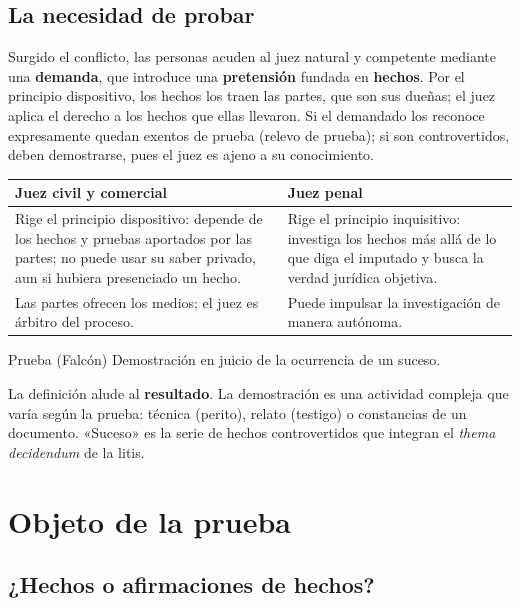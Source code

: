 \documentclass[12pt,oneside]{book}
\renewcommand{\arraystretch}{1.15}
\begin{document}
\subsection{La necesidad de probar}

Surgido el conflicto, las personas acuden al juez natural y competente mediante una \textbf{demanda}, que introduce una \textbf{pretensión} fundada en \textbf{hechos}. Por el principio dispositivo, los hechos los traen las partes, que son sus dueñas; el juez aplica el derecho a los hechos que ellas llevaron. Si el demandado los reconoce expresamente quedan exentos de prueba (relevo de prueba); si son controvertidos, deben demostrarse, pues el juez es ajeno a su conocimiento.

\begin{table}[H]
\centering
\renewcommand{\arraystretch}{1.25}
\begin{tabularx}{\textwidth}{>{\RaggedRight\arraybackslash}X>{\RaggedRight\arraybackslash}X}
\toprule
\textbf{Juez civil y comercial} & \textbf{Juez penal} \\
\midrule
Rige el principio dispositivo: depende de los hechos y pruebas aportados por las partes; no puede usar su saber privado, aun si hubiera presenciado un hecho. & Rige el principio inquisitivo: investiga los hechos más allá de lo que diga el imputado y busca la verdad jurídica objetiva. \\
Las partes ofrecen los medios; el juez es árbitro del proceso. & Puede impulsar la investigación de manera autónoma. \\
\bottomrule
\end{tabularx}
\end{table}

\begin{definition}{Prueba (Falcón)}
Demostración en juicio de la ocurrencia de un suceso.
\end{definition}

La definición alude al \textbf{resultado}. La demostración es una actividad compleja que varía según la prueba: técnica (perito), relato (testigo) o constancias de un documento. «Suceso» es la serie de hechos controvertidos que integran el \textit{thema decidendum} de la litis.

\section{Objeto de la prueba}

\subsection{¿Hechos o afirmaciones de hechos?}
\end{document}
